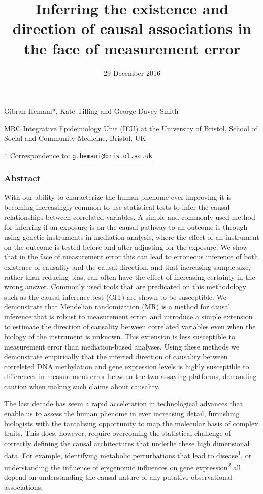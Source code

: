 \documentclass[]{article}
\title{Inferring the existence and direction of causal associations in the face
of measurement error}
\author{}
\date{29 December 2016}
\begin{document}
\maketitle

Gibran Hemani*, Kate Tilling and George Davey Smith

MRC Integrative Epidemiology Unit (IEU) at the University of Bristol,
School of Social and Community Medicine, Bristol, UK

* Correspondence to:
\href{mailto:g.hemani@bristol.ac.uk}{\nolinkurl{g.hemani@bristol.ac.uk}}

\subsubsection{Abstract}\label{abstract}

With our ability to characterize the human phenome ever improving it is
becoming increasingly common to use statistical tests to infer the
causal relationships between correlated variables. A simple and commonly
used method for inferring if an exposure is on the causal pathway to an
outcome is through using genetic instruments in mediation analysis,
where the effect of an instrument on the outcome is tested before and
after adjusting for the exposure. We show that in the face of
measurement error this can lead to erroneous inference of both existence
of causality and the causal direction, and that increasing sample size,
rather than reducing bias, can often have the effect of increasing
certainty in the wrong answer. Commonly used tools that are predicated
on this methodology such as the causal inference test (CIT) are shown to
be susceptible. We demonstrate that Mendelian randomization (MR) is a
method for causal inference that is robust to measurement error, and
introduce a simple extension to estimate the direction of causality
between correlated variables even when the biology of the instrument is
unknown. This extension is less susceptible to measurement error than
mediation-based analyses. Using these methods we demonstrate empirically
that the inferred direction of causality between correleted DNA
methylation and gene expression levels is highly susceptible to
differences in measurement error between the two assaying platforms,
demanding caution when making such claims about causality.

The last decade has seem a rapid acceleration in technological advances
that enable us to assess the human phenome in ever increasing detail,
furnishing biologists with the tantalising opportunity to map the
molecular basis of complex traits. This does, however, require
overcoming the statistical challenge of correctly defining the causal
architectures that underlie these high dimensional data. For example,
identifying metabolic perturbations that lead to
disease\textsuperscript{1}, or understanding the influence of epigenomic
influences on gene expression\textsuperscript{2} all depend on
understanding the causal nature of any putative observational
associations.
\end{document}
